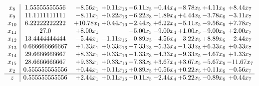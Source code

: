\documentclass[9pt]{article}
\begin{document}
\[\begin{array}{c| c c@{\hskip 2pt} c@{\hskip 2pt} c@{\hskip 2pt} c@{\hskip 2pt} c@{\hskip 2pt} c@{\hskip 2pt} c@{\hskip 2pt} }
 x_{8}   &  1.55555555556 & -8.56 x_{1} & +  0.11 x_{16} & -6.11 x_{3} & -0.44 x_{4} & -8.78 x_{5} & +  4.11 x_{6} & +  8.44 x_{7}\\
 x_{9}   &  11.1111111111 & -8.11 x_{1} & +  0.22 x_{16} & -6.22 x_{3} & -1.89 x_{4} & +  4.44 x_{5} & -3.78 x_{6} & -3.11 x_{7}\\
 x_{10}   &  6.22222222222 & + 10.78 x_{1} & +  0.44 x_{16} & -2.44 x_{3} & +  6.22 x_{4} & -5.11 x_{5} & -9.56 x_{6} & +  7.78 x_{7}\\
 x_{11}   &  27.0 & +  8.00 x_{1} &   & -5.00 x_{3} & -9.00 x_{4} & +  1.00 x_{5} & -9.00 x_{6} & +  2.00 x_{7}\\
 x_{12}   &  13.4444444444 & -5.44 x_{1} & -1.11 x_{16} & -0.89 x_{3} & -4.56 x_{4} & -3.22 x_{5} & +  8.89 x_{6} & -2.44 x_{7}\\
 x_{13}   &  0.666666666667 & +  1.33 x_{1} & +  0.33 x_{16} & -7.33 x_{3} & -5.33 x_{4} & -1.33 x_{5} & +  6.33 x_{6} & +  0.33 x_{7}\\
 x_{14}   &  29.6666666667 & +  8.33 x_{1} & +  0.33 x_{16} & -1.33 x_{3} & -4.33 x_{4} & -9.33 x_{5} & -4.67 x_{6} & +  1.33 x_{7}\\
 x_{15}   &  28.6666666667 & +  9.33 x_{1} & +  0.33 x_{16} & -7.33 x_{3} & +  3.67 x_{4} & +  3.67 x_{5} & -5.67 x_{6} & -11.67 x_{7}\\
 x_{2}   &  0.555555555556 & +  0.44 x_{1} & +  0.11 x_{16} & +  0.89 x_{3} & +  0.56 x_{4} & +  0.22 x_{5} & +  0.11 x_{6} & -0.56 x_{7}\\
\hline
z    &  0.555555555556 & +  2.44 x_{1} & +  0.11 x_{16} & -0.11 x_{3} & -2.44 x_{4} & +  5.22 x_{5} & -0.89 x_{6} & +  0.44 x_{7}\\
\end{array}\]
\end{document}
